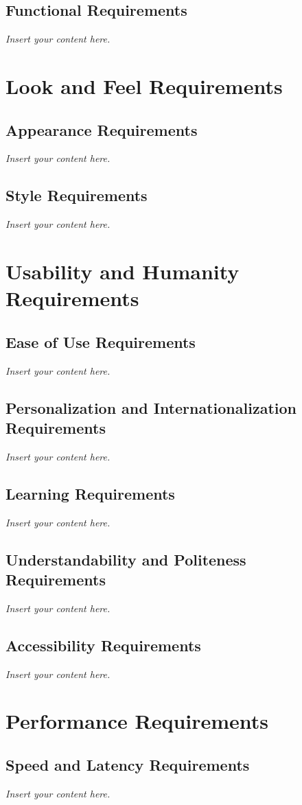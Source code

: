 \documentclass[12pt]{article}
\newcommand{\lips}{\textit{Insert your content here.}}
\begin{document}
\subsection{Functional Requirements}
\lips

\section{Look and Feel Requirements}
\subsection{Appearance Requirements}
\lips
\subsection{Style Requirements}
\lips

\section{Usability and Humanity Requirements}
\subsection{Ease of Use Requirements}
\lips
\subsection{Personalization and Internationalization Requirements}
\lips
\subsection{Learning Requirements}
\lips
\subsection{Understandability and Politeness Requirements}
\lips
\subsection{Accessibility Requirements}
\lips

\section{Performance Requirements}
\subsection{Speed and Latency Requirements}
\lips
\end{document}
